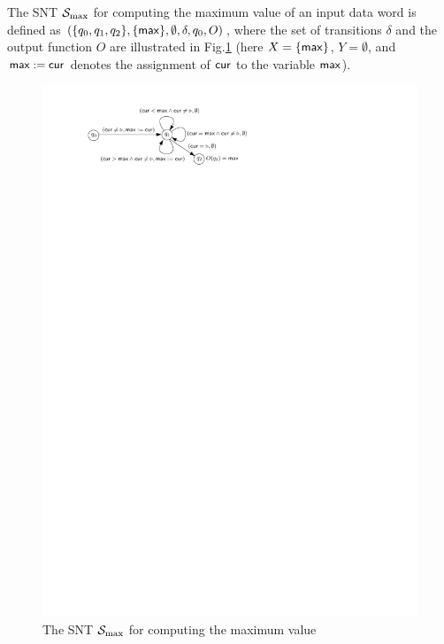 \begin{example}
The SNT ${\mathcal{S} }_{\max}$ for computing the maximum value of an input data word is defined as $(\{q_0,q_1,q_2\}, \{\mathsf{max}\}, \emptyset, \delta, q_0, O)$, where the set of transitions $\delta$ and the output function $O$ are illustrated in Fig.\ref{fig-snt-exmp}
%
(here $X=\{\mathsf{max}\}$, $Y=\emptyset$, and $\mathsf{max}:=\mathsf{cur}$ denotes the assignment of $\mathsf{cur}$ to the variable $\mathsf{max}$).

\vspace{-2mm}
\begin{figure}[htbp]
\begin{center}
\includegraphics{snt-exmp.pdf}
\caption{The SNT ${\mathcal{S} }_{\max}$ for computing the maximum value}
\label{fig-snt-exmp}
\end{center}
\vspace{-6mm}
\end{figure}
\end{example}

